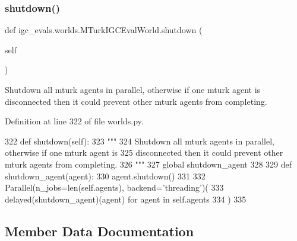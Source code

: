 \mbox{\label{classigc__evals_1_1worlds_1_1MTurkIGCEvalWorld_a8598b24c39425e921c38ef45fb1f7e95}} 
\subsubsection{\texorpdfstring{shutdown()}{shutdown()}}
{\footnotesize\ttfamily def igc\+\_\+evals.\+worlds.\+M\+Turk\+I\+G\+C\+Eval\+World.\+shutdown (\begin{DoxyParamCaption}\item[{}]{self }\end{DoxyParamCaption})}

\begin{DoxyVerb}Shutdown all mturk agents in parallel, otherwise if one mturk agent is
disconnected then it could prevent other mturk agents from completing.
\end{DoxyVerb}
 

Definition at line 322 of file worlds.\+py.


\begin{DoxyCode}
322     \textcolor{keyword}{def }shutdown(self):
323         \textcolor{stringliteral}{"""}
324 \textcolor{stringliteral}{        Shutdown all mturk agents in parallel, otherwise if one mturk agent is}
325 \textcolor{stringliteral}{        disconnected then it could prevent other mturk agents from completing.}
326 \textcolor{stringliteral}{        """}
327         \textcolor{keyword}{global} shutdown\_agent
328 
329         \textcolor{keyword}{def }shutdown\_agent(agent):
330             agent.shutdown()
331 
332         Parallel(n\_jobs=len(self.agents), backend=\textcolor{stringliteral}{'threading'})(
333             delayed(shutdown\_agent)(agent) \textcolor{keywordflow}{for} agent \textcolor{keywordflow}{in} self.agents
334         )
335 \end{DoxyCode}


\subsection{Member Data Documentation}
\mbox{\label{classigc__evals_1_1worlds_1_1MTurkIGCEvalWorld_a2d85992a36e835c15f629b2ad0cd098d}} 
